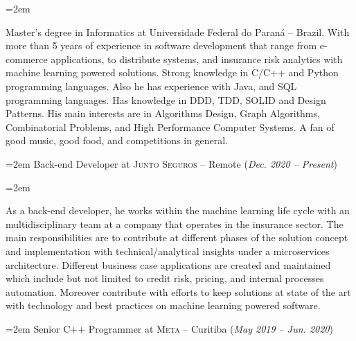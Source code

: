 \documentclass[fontsize=14pt,paper=a4]{scrartcl}
\newcommand{\MarginText}[1]{\marginpar{\raggedleft\itshape\footnotesize#1}}
\newcommand{\WorkEntry}[2]{\noindent\hangindent=2em\hangafter=0%
  {\small #2} {(\small \textit{#1}})\vspace{.5em}}
\newcommand{\Description}[1]{\hangindent=2em\hangafter=0\noindent\raggedright\footnotesize{#1}\par\flushleft\normalsize}
\begin{document}
\begin{cv}
  \vspace{1em}

  \noindent{}\vspace{.5em}
  
  \Description{%
    Master's degree in Informatics at Universidade Federal do Paraná --
    Brazil. With more than 5 years of experience in software development that
    range from e-commerce applications, to distribute systems, and insurance
    risk analytics with machine learning powered solutions. Strong knowledge in
    C/C++ and Python programming languages. Also he has experience with Java,
    and SQL programming languages. Has knowledge in DDD, TDD, SOLID and Design
    Patterns. His main interests are in Algorithms Design, Graph Algorithms,
    Combinatorial Problems, and High Performance Computer Systems. A fan of good
    music, good food, and competitions in general.%
  }


  \noindent{}\vspace{.5em}

  \WorkEntry{Dec. 2020 -- Present}{Back-end Developer at \textsc{Junto Seguros} -- Remote}

  \Description{%
    \MarginText{Junto Seguros}%
    As a back-end developer, he works within the machine learning life cycle
    with an multidisciplinary team at a company that operates in the insurance
    sector. The main responsibilities are to contribute at different phases of
    the solution concept and implementation with technical/analytical insights
    under a microservices architecture. Different business case applications are
    created and maintained which include but not limited to credit risk,
    pricing, and internal processes automation. Moreover contribute with efforts
    to keep solutions at state of the art with technology and best practices on
    machine learning powered software. %
  }


  \WorkEntry{May 2019 -- Jun. 2020}{Senior C++ Programmer at \textsc{Meta} -- Curitiba}
  

\end{cv}
\end{document}
